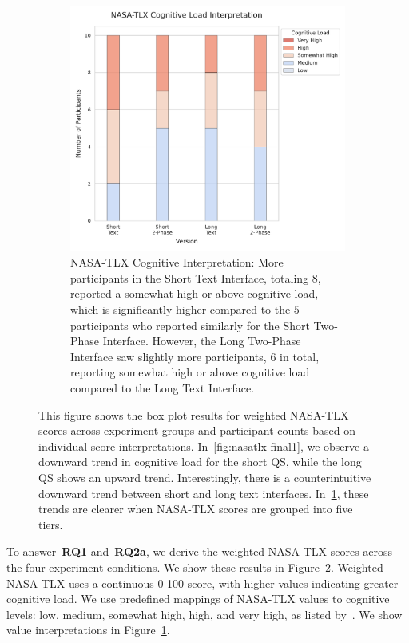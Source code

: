 \begin{figure}[ht]
\begin{subfigure}[b]{0.47\textwidth}
        \centering
        \includegraphics[width=\textwidth]{content/image/results/nasatlx_cog_value_interpreted.pdf}
        \caption{NASA-TLX Cognitive Interpretation: More participants in the Short Text Interface, totaling $8$, reported a somewhat high or above cognitive load, which is significantly higher compared to the $5$ participants who reported similarly for the Short Two-Phase Interface. However, the Long Two-Phase Interface saw slightly more participants, $6$ in total, reporting somewhat high or above cognitive load compared to the Long Text Interface.\vspace{21pt}}
        \label{fig:nasatlx-final2}
    \end{subfigure}
    \caption{This figure shows the box plot results for weighted NASA-TLX scores across experiment groups and participant counts based on individual score interpretations. In~\ref{fig:nasatlx-final1}, we observe a downward trend in cognitive load for the short QS, while the long QS shows an upward trend. Interestingly, there is a counterintuitive downward trend between short and long text interfaces. In~\ref{fig:nasatlx-final2}, these trends are clearer when NASA-TLX scores are grouped into five tiers.}
    \label{fig:nasatlx-final}
\end{figure}

To answer~\textbf{RQ1} and~\textbf{RQ2a}, we derive the weighted NASA-TLX scores across the four experiment conditions. We show these results in Figure~\ref{fig:nasatlx-final}. Weighted NASA-TLX uses a continuous 0-100 score, with higher values indicating greater cognitive load. We use predefined mappings of NASA-TLX values to cognitive levels: low, medium, somewhat high, high, and very high, as listed by~\textcite{hart1988development}. We show value interpretations in Figure~\ref{fig:nasatlx-final2}. 

